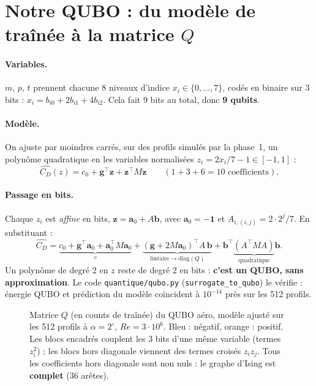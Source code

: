 \section{Notre QUBO : du modèle de traînée à la matrice $Q$}\label{sec:notre-qubo}
\paragraph{Variables.} $m$, $p$, $t$ prennent chacune 8 niveaux d'indice $x_i\in\{0,\dots,7\}$, codés en binaire sur 3 bits : $x_i=b_{i0}+2b_{i1}+4b_{i2}$. Cela fait 9 bits au total, donc \textbf{9 qubits}.

\paragraph{Modèle.} On ajuste par moindres carrés, sur des profils simulés par la phase~1, un polynôme quadratique en les variables normalisées $z_i=2x_i/7-1\in[-1,1]$ :
\[\widehat{C_D}(z)=c_0+\mathbf g^\top\mathbf z+\mathbf z^\top M\mathbf z\qquad(1+3+6=10\text{ coefficients}).\]

\paragraph{Passage en bits.} Chaque $z_i$ est \emph{affine} en bits, $\mathbf z=\mathbf a_0+A\mathbf b$, avec $\mathbf a_0=-\mathbf 1$ et $A_{i,(i,j)}=2\cdot2^j/7$. En substituant :
\[\widehat{C_D}=\underbrace{c_0+\mathbf g^\top\mathbf a_0+\mathbf a_0^\top M\mathbf a_0}_{c}+\underbrace{(\mathbf g+2M\mathbf a_0)^\top A\,\mathbf b}_{\text{linéaire}\to\text{diag}(Q)}+\mathbf b^\top\underbrace{(A^\top MA)}_{\text{quadratique}}\mathbf b .\]
Un polynôme de degré 2 en $z$ reste de degré 2 en bits : \textbf{c'est un QUBO, sans approximation}. Le code \texttt{quantique/qubo.py} (\texttt{surrogate\_to\_qubo}) le vérifie : énergie QUBO et prédiction du modèle coïncident à $10^{-14}$ près sur les 512 profils.

\begin{figure}[htbp]
\centering

\caption{Matrice $Q$ (en counts de traînée) du QUBO aéro, modèle ajusté sur les 512 profils à $\alpha=2^\circ$, $Re=3\cdot10^6$. Bleu : négatif, orange : positif. Les blocs encadrés couplent les 3 bits d'une même variable (termes $z_i^2$) ; les blocs hors diagonale viennent des termes croisés $z_iz_j$. Tous les coefficients hors diagonale sont non nuls : le graphe d'Ising est \textbf{complet} (36 arêtes).}\label{fig:matrice-q}
\end{figure}

